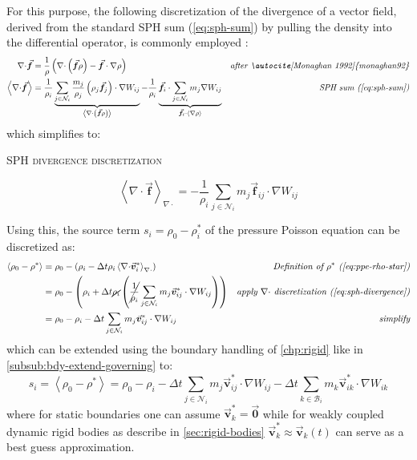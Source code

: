 \documentclass[oneside, a4paper]{book}
\newcommand{\equationnamed}[2]{%
  \setlength{\fboxsep}{2pt} %
  \setlength{\fboxrule}{0.01pt}
  \begin{center}
    \begin{minipage}{\textwidth}
      \begin{center}\textsc{#1}\end{center}
      #2
    \end{minipage}
  \end{center}
}
\newcommand\angled[1]{\left\langle#1\right\rangle}
\newcommand\vek[1]{\vec{\bm{#1}}}
\newcommand\br[1]{\left(#1\right)}
\newcommand\divergence{{\nabla\cdot}}
\begin{document}
    For this purpose, the following discretization of the divergence of a vector field, derived from the standard SPH sum (\autoref{eq:sph-sum}) by pulling the density into the differential operator, is commonly employed \autocites{monaghan92}{2014-survey-state-of-the-art-sph}: 
    \begin{align}
      \divergence \vek{f}&= \frac{1}{\rho}\br{\divergence \br{\vek{f}\rho} - \vek{f}\cdot\nabla\rho}
      &\textit{after \autocite[Monaghan 1992]{monaghan92}}\\
      \angled{\divergence \vek{f}} &= \frac{1}{\rho_i} \underbrace{\sum_{j\in\mathcal{N}_i}  \frac{m_j}{\rho_j} \br{\rho_j\vek{f}_j} \cdot \nabla W_{ij}}_{\angled{\divergence \br{\vek{f}\rho}}}
        - \frac{1}{\rho_i} \underbrace{\vek{f}_i \cdot \sum_{j\in\mathcal{N}_i}  m_j \nabla W_{ij}}_{\vek{f}_i\cdot \angled{\nabla\rho}}&\textit{SPH sum (\autoref{eq:sph-sum})}
    \end{align}
    which simplifies to:
    \equationnamed{SPH divergence discretization}{
      \begin{equation}
        \angled{\divergence \vek{f}}_{\divergence} = 
        -\frac{1}{\rho_i} \sum_{j\in\mathcal{N}_i}  
          m_j\vek{f}_{ij}\cdot\nabla W_{ij}
        \label{eq:sph-divergence}
      \end{equation}  
    }

    Using this, the source term $s_i=\rho_0-\rho^*_i$ of the pressure Poisson equation can be discretized as:
    \begin{align}
      \angled{\rho_0-\rho^*} &= \rho_0 - \br{\rho_i - \Delta t \rho_i \angled{\divergence \vek{v}^*_i}_\divergence} &\textit{Definition of $\rho^*$ (\autoref{eq:ppe-rho-star})}\\
      &= \rho_0 - \br{\rho_i + \Delta t \cancel{\rho_i} \br{\cancel{\frac{1}{\rho_i}} \sum_{j\in\mathcal{N}_i} m_j\vek{v}^*_{ij}\cdot\nabla W_{ij}}} &\textit{apply $\divergence$ discretization (\autoref{eq:sph-divergence})}\\
      &= \rho_0 - \rho_i - \Delta t \sum_{j\in\mathcal{N}_i}  m_j\vek{v}^*_{ij}\cdot\nabla W_{ij} &\textit{simplify}
    \end{align}
    which can be extended using the boundary handling of \autoref{chp:rigid} like in \autoref{subsub:bdy-extend-governing} to:
    \begin{equation}
      s_i = \angled{\rho_0-\rho^*} =
      \rho_0 - \rho_i 
      - \Delta t \sum_{j\in\mathcal{N}_i}  m_j\vek{v}^*_{ij}\cdot\nabla W_{ij} 
      - \Delta t \sum_{k\in\mathcal{B}_i}  m_k\vek{v}^*_{ik}\cdot\nabla W_{ik}
      \label{eq:iisph-source-term}
    \end{equation}
    where for static boundaries one can assume $\vek{v}^*_k=\vek{0}$ while for weakly coupled dynamic rigid bodies as describe in \autoref{sec:rigid-bodies} $\vek{v}^*_k \approx \vek{v}_k\br{t}$ can serve as a best guess approximation. 
    
\end{document}
